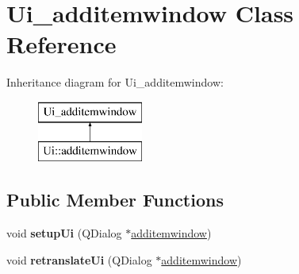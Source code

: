 \hypertarget{class_ui__additemwindow}{}\section{Ui\+\_\+additemwindow Class Reference}
\label{class_ui__additemwindow}
Inheritance diagram for Ui\+\_\+additemwindow\+:\begin{figure}[H]
\begin{center}
\leavevmode
\includegraphics[height=2.000000cm]{class_ui__additemwindow}
\end{center}
\end{figure}
\subsection*{Public Member Functions}
\begin{DoxyCompactItemize}
\item 
\mbox{\label{class_ui__additemwindow_ad2f9200f673b00cceaa11e33f2594529}} 
void {\bfseries setup\+Ui} (Q\+Dialog $\ast$\mbox{\hyperlink{classadditemwindow}{additemwindow}})
\item 
\mbox{\label{class_ui__additemwindow_a788027255ca440fb8a1c68f0bcda386a}} 
void {\bfseries retranslate\+Ui} (Q\+Dialog $\ast$\mbox{\hyperlink{classadditemwindow}{additemwindow}})
\end{DoxyCompactItemize}
